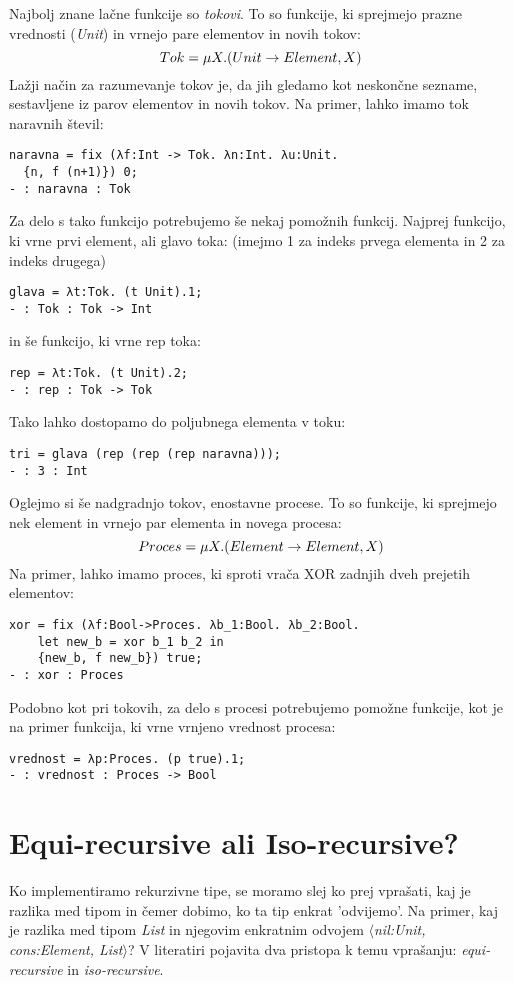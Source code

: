 \documentclass[12pt,a4paper,openany]{book}
\begin{document}
Najbolj znane lačne funkcije so \emph{tokovi}. To so funkcije, ki sprejmejo prazne vrednosti (\emph{Unit}) in vrnejo pare elementov in novih tokov:
\begin{equation}
    Tok = \mu X. (Unit \rightarrow {Element, X}) \notag
\end{equation}
Lažji način za razumevanje tokov je, da jih gledamo kot neskončne sezname, sestavljene iz parov elementov in novih tokov. Na primer, lahko imamo tok naravnih števil:
\begin{lstlisting}
naravna = fix (λf:Int -> Tok. λn:Int. λu:Unit. 
  {n, f (n+1)}) 0;
- : naravna : Tok
\end{lstlisting}
Za delo s tako funkcijo potrebujemo še nekaj pomožnih funkcij. Najprej funkcijo, ki vrne prvi element, ali glavo toka: (imejmo 1 za indeks prvega elementa in 2 za indeks drugega)
\begin{lstlisting}
glava = λt:Tok. (t Unit).1;
- : Tok : Tok -> Int
\end{lstlisting}
in še funkcijo, ki vrne rep toka:
\begin{lstlisting}
rep = λt:Tok. (t Unit).2;
- : rep : Tok -> Tok
\end{lstlisting}
Tako lahko dostopamo do poljubnega elementa v toku:
\begin{lstlisting}
tri = glava (rep (rep (rep naravna)));
- : 3 : Int
\end{lstlisting}

Oglejmo si še nadgradnjo tokov, enostavne procese. To so funkcije, ki sprejmejo nek element in vrnejo par elementa in novega procesa:
\begin{equation}
    Proces = \mu X. (Element \rightarrow {Element, X}) \notag
\end{equation}
Na primer, lahko imamo proces, ki sproti vrača XOR zadnjih dveh prejetih elementov:
\begin{lstlisting}
xor = fix (λf:Bool->Proces. λb_1:Bool. λb_2:Bool. 
    let new_b = xor b_1 b_2 in
    {new_b, f new_b}) true;
- : xor : Proces
\end{lstlisting}
Podobno kot pri tokovih, za delo s procesi potrebujemo pomožne funkcije, kot je na primer funkcija, ki vrne vrnjeno vrednost procesa:
\begin{lstlisting}
vrednost = λp:Proces. (p true).1;
- : vrednost : Proces -> Bool
\end{lstlisting}


\section{Equi-recursive ali Iso-recursive?}
Ko implementiramo rekurzivne tipe, se moramo slej ko prej vprašati, kaj je razlika med tipom in čemer dobimo, ko ta tip enkrat 'odvijemo'. Na primer, kaj je razlika med tipom \emph{List}
in njegovim enkratnim odvojem \emph{$\langle$nil:Unit, cons:{Element, List}$\rangle$}? V literatiri pojavita dva pristopa k temu vprašanju: \emph{equi-recursive} in \emph{iso-recursive}.
\end{document}
